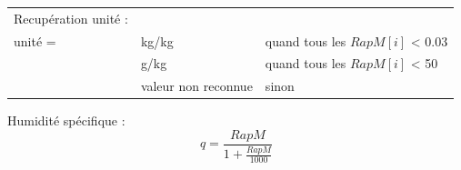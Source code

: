 
\begin{tabular}{lll}
    Recup\'eration unit\'e : &\\
    unit\'e = & kg/kg & quand tous les   $RapM[i]$ < 0.03 \\
              & g/kg  & quand tous les  $RapM[i]$ < 50 \\
              & valeur non reconnue  & sinon \\
\end{tabular}


Humidit\'e sp\'ecifique :
\[
    q = \frac{RapM}{ 1 + \frac{RapM}{1000} }
\]

